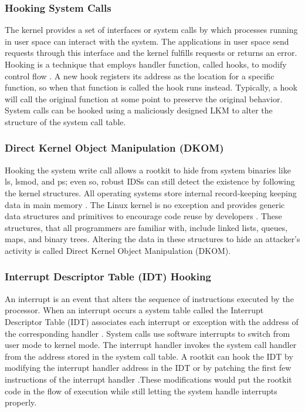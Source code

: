 \subsubsection{Hooking System Calls}
The kernel provides a set  of  interfaces or system calls by which processes running
 in user space can interact with the system. The applications in user space send requests
 through this interface and the kernel fulfills requests or returns an error. Hooking is a technique that employs handler function, called hooks, to modify
 control flow . A new hook registers its address as the location for a specific
function, so when that function is called the hook runs instead. Typically, a hook will call
 the original function at some point to preserve the original behavior. System calls can be
 hooked using a maliciously designed LKM to alter the structure of the system call table.

\subsubsection{Direct Kernel Object Manipulation (DKOM)}
Hooking the system write call allows a rootkit to hide from system binaries like
 ls, lsmod, and ps; even so, robust IDSs can still detect the existence by following the
 kernel structures. All operating systems store internal record-keeping
 keeping data in main
 memory . The Linux kernel is no exception and provides generic data structures
 and primitives to encourage code reuse by developers . These structures, that all
 programmers are familiar with, include linked lists, queues, maps, and binary trees.
 Altering the data in these structures to hide an attacker’s activity is called Direct Kernel
 Object Manipulation (DKOM).

\subsubsection{Interrupt Descriptor Table (IDT) Hooking}
An interrupt is an event that alters the sequence of instructions executed by the
 processor. When an interrupt occurs a system table called the Interrupt Descriptor Table
 (IDT) associates each interrupt or exception with the address of the corresponding
 handler . System calls use software interrupts to switch from user mode to kernel
 mode. The interrupt handler invokes the system call handler from the address stored in
 the system call table. A rootkit can hook the IDT by modifying the interrupt handler
 address in the IDT or by patching the first few instructions of the interrupt handler
.These modifications would put the rootkit code in the flow of execution while
 still letting the system handle interrupts properly.










